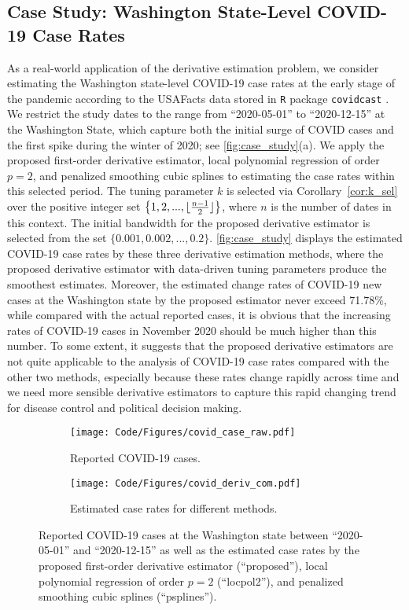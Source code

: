 \documentclass{uwstat572}
\theoremstyle{definition}
\DeclarePairedDelimiter\floor{\lfloor}{\rfloor}
\theoremstyle{theorem}
\begin{document}
\subsection{Case Study: Washington State-Level COVID-19 Case Rates}
\label{App:case_study}

As a real-world application of the derivative estimation problem, we consider estimating the Washington state-level COVID-19 case rates at the early stage of the pandemic according to the USAFacts data stored in \texttt{R} package \texttt{covidcast} \citep{reinhart2021open}. We restrict the study dates to the range from ``2020-05-01'' to ``2020-12-15'' at the Washington State, which capture both the initial surge of COVID cases and the first spike during the winter of 2020; see \autoref{fig:case_study}(a). We apply the proposed first-order derivative estimator, local polynomial regression of order $p=2$, and penalized smoothing cubic splines to estimating the case rates within this selected period. The tuning parameter $k$ is selected via Corollary~\ref{cor:k_sel} over the positive integer set $\left\{1,2,...,\floor{\frac{n-1}{2}}\right\}$, where $n$ is the number of dates in this context. The initial bandwidth for the proposed derivative estimator is selected from the set $\{0.001, 0.002,...,0.2\}$. \autoref{fig:case_study} displays the estimated COVID-19 case rates by these three derivative estimation methods, where the proposed derivative estimator with data-driven tuning parameters produce the smoothest estimates. Moreover, the estimated change rates of COVID-19 new cases at the Washington state by the proposed estimator never exceed 71.78\%, while compared with the actual reported cases, it is obvious that the increasing rates of COVID-19 cases in November 2020 should be much higher than this number. To some extent, it suggests that the proposed derivative estimators are not quite applicable to the analysis of COVID-19 case rates compared with the other two methods, especially because these rates change rapidly across time and we need more sensible derivative estimators to capture this rapid changing trend for disease control and political decision making.

\begin{figure}[!t]
	\captionsetup[subfigure]{justification=centering}
	\begin{subfigure}[t]{0.49\linewidth}
		\centering
		\texttt{[image: Code/Figures/covid\_case\_raw.pdf]}
		\caption{Reported COVID-19 cases.}
	\end{subfigure}
	\hfil
	\begin{subfigure}[t]{0.49\linewidth}
		\centering
		\texttt{[image: Code/Figures/covid\_deriv\_com.pdf]}
		\caption{Estimated case rates for different methods.}
	\end{subfigure}
	\caption{Reported COVID-19 cases at the Washington state between ``2020-05-01'' and ``2020-12-15'' as well as the estimated case rates by the proposed first-order derivative estimator (``proposed''), local polynomial regression of order $p=2$ (``locpol2''), and penalized smoothing cubic splines (``psplines'').}
	\label{fig:case_study}
\end{figure}
\end{document}
